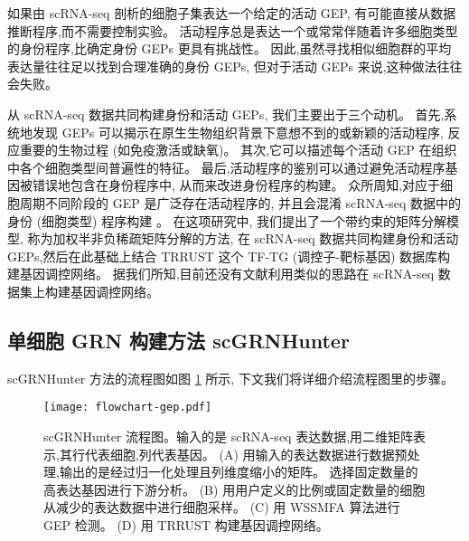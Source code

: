 如果由 scRNA-seq 剖析的细胞子集表达一个给定的活动 GEP,
有可能直接从数据推断程序,而不需要控制实验。
活动程序总是表达一个或常常伴随着许多细胞类型的身份程序,比确定身份 GEPs 更具有挑战性。
因此,虽然寻找相似细胞群的平均表达量往往足以找到合理准确的身份 GEPs,
但对于活动 GEPs 来说,这种做法往往会失败。

从 scRNA-seq 数据共同构建身份和活动 GEPs, 我们主要出于三个动机。
首先,系统地发现 GEPs 可以揭示在原生生物组织背景下意想不到的或新颖的活动程序,
反应重要的生物过程 (如免疫激活或缺氧)。
其次,它可以描述每个活动 GEP 在组织中各个细胞类型间普遍性的特征。
最后,活动程序的鉴别可以通过避免活动程序基因被错误地包含在身份程序中, 从而来改进身份程序的构建。
众所周知,对应于细胞周期不同阶段的 GEP 是广泛存在活动程序的,
并且会混淆 scRNA-seq 数据中的身份 (细胞类型) 程序构建 \cite{scialdone2015computational,chen2017controlling}。
在这项研究中, 我们提出了一个带约束的矩阵分解模型, 称为加权半非负稀疏矩阵分解的方法,
在 scRNA-seq 数据共同构建身份和活动 GEPs,然后在此基础上结合 TRRUST 这个 TF-TG (调控子-靶标基因) 数据库构建基因调控网络。
据我们所知,目前还没有文献利用类似的思路在 scRNA-seq 数据集上构建基因调控网络。

\subsection{单细胞 GRN 构建方法 scGRNHunter}

scGRNHunter 方法的流程图如图 \ref{fig:gep-flowchart} 所示, 下文我们将详细介绍流程图里的步骤。
\begin{figure}[!htbp]
    \centering
    \texttt{[image: flowchart-gep.pdf]}
    \caption{
        scGRNHunter 流程图。输入的是 scRNA-seq 表达数据,用二维矩阵表示,其行代表细胞,列代表基因。
        (A) 用输入的表达数据进行数据预处理,输出的是经过归一化处理且列维度缩小的矩阵。
        选择固定数量的高表达基因进行下游分析。
        (B) 用用户定义的比例或固定数量的细胞从减少的表达数据中进行细胞采样。
        (C) 用 WSSMFA 算法进行 GEP 检测。
        (D) 用 TRRUST 构建基因调控网络。
    }
    \label{fig:gep-flowchart}
\end{figure}

